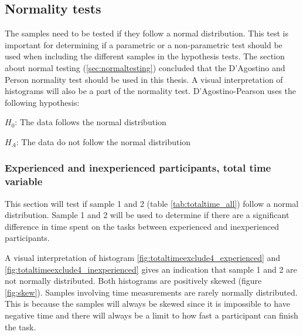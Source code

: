 \subsection{Normality tests}\label{sec:normality_results}
The samples need to be tested if they follow a normal distribution. This test is important for determining if a parametric or a non-parametric test should be used when including the different samples in the hypothesis tests. The section about normal testing (\ref{sec:normaltesting}) concluded that the D'Agostino and Person normality test should be used in this thesis. A visual interpretation of histograms will also be a part of the normality test. D'Agostino-Pearson uses the following hypothesis:\newline

\centerline{$H_{0}$: The data follows the normal distribution} 
\centerline{$H_{A}$: The data do not follow the normal distribution}


\subsubsection[Sample 1 and 2]{Experienced and inexperienced participants, total time variable}\label{sec:sample1,2_normresult}
This section will test if sample 1 and 2 (table \ref{tab:totaltime_all}) follow a normal distribution. Sample 1 and 2 will be used to determine if there are a significant difference in time spent on the tasks between experienced and inexperienced participants. 

A visual interpretation of histogram \ref{fig:totaltimeexclude4_experienced} and \ref{fig:totaltimeexclude4_inexperienced} gives an indication that sample 1 and 2 are not normally distributed. Both histograms are positively skewed (figure \ref{fig:skew}). Samples involving time measurements are rarely normally distributed. This is because the samples will always be skewed since it is impossible to have negative time and there will always be a limit to how fast a participant can finish the task. 

